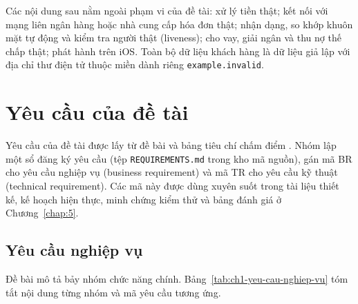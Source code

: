 Các nội dung sau nằm ngoài phạm vi của đề tài: xử lý tiền thật; kết nối với mạng liên ngân hàng hoặc nhà cung cấp hóa đơn thật; nhận dạng, so khớp khuôn mặt tự động và kiểm tra người thật (liveness); cho vay, giải ngân và thu nợ thế chấp thật; phát hành trên iOS. Toàn bộ dữ liệu khách hàng là dữ liệu giả lập với địa chỉ thư điện tử thuộc miền dành riêng \texttt{example.\allowbreak{}invalid}.

\section{Yêu cầu của đề tài}
\label{sec:ch1-yeu-cau}

Yêu cầu của đề tài được lấy từ đề bài \parencite{ch1-debai} và bảng tiêu chí chấm điểm \parencite{ch1-tieuchi}. Nhóm lập một sổ đăng ký yêu cầu (tệp \texttt{REQUIREMENTS.\allowbreak{}md} trong kho mã nguồn), gán mã BR cho yêu cầu nghiệp vụ (business requirement) và mã TR cho yêu cầu kỹ thuật (technical requirement). Các mã này được dùng xuyên suốt trong tài liệu thiết kế, kế hoạch hiện thực, minh chứng kiểm thử và bảng đánh giá ở Chương~\ref{chap:5}.

\subsection{Yêu cầu nghiệp vụ}

Đề bài mô tả bảy nhóm chức năng chính. Bảng~\ref{tab:ch1-yeu-cau-nghiep-vu} tóm tắt nội dung từng nhóm và mã yêu cầu tương ứng.


